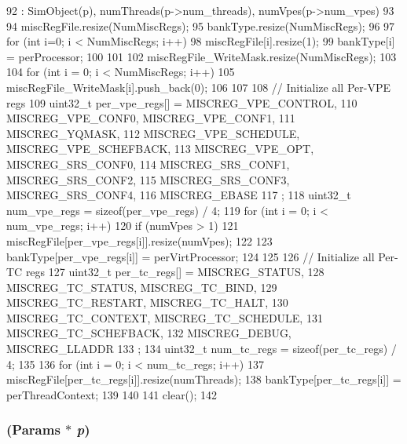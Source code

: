 \begin{DoxyCode}
92     : SimObject(p), numThreads(p->num_threads), numVpes(p->num_vpes)
93 {
94     miscRegFile.resize(NumMiscRegs);
95     bankType.resize(NumMiscRegs);
96 
97     for (int i=0; i < NumMiscRegs; i++) {
98         miscRegFile[i].resize(1);
99         bankType[i] = perProcessor;
100     }
101 
102     miscRegFile_WriteMask.resize(NumMiscRegs);
103 
104     for (int i = 0; i < NumMiscRegs; i++) {
105         miscRegFile_WriteMask[i].push_back(0);
106     }
107 
108     // Initialize all Per-VPE regs
109     uint32_t per_vpe_regs[] = { MISCREG_VPE_CONTROL,
110                                 MISCREG_VPE_CONF0, MISCREG_VPE_CONF1,
111                                 MISCREG_YQMASK,
112                                 MISCREG_VPE_SCHEDULE, MISCREG_VPE_SCHEFBACK,
113                                 MISCREG_VPE_OPT, MISCREG_SRS_CONF0,
114                                 MISCREG_SRS_CONF1, MISCREG_SRS_CONF2,
115                                 MISCREG_SRS_CONF3, MISCREG_SRS_CONF4,
116                                 MISCREG_EBASE
117                               };
118     uint32_t num_vpe_regs = sizeof(per_vpe_regs) / 4;
119     for (int i = 0; i < num_vpe_regs; i++) {
120         if (numVpes > 1) {
121             miscRegFile[per_vpe_regs[i]].resize(numVpes);
122         }
123         bankType[per_vpe_regs[i]] = perVirtProcessor;
124     }
125 
126     // Initialize all Per-TC regs
127     uint32_t per_tc_regs[] = { MISCREG_STATUS,
128                                MISCREG_TC_STATUS, MISCREG_TC_BIND,
129                                MISCREG_TC_RESTART, MISCREG_TC_HALT,
130                                MISCREG_TC_CONTEXT, MISCREG_TC_SCHEDULE,
131                                MISCREG_TC_SCHEFBACK,
132                                MISCREG_DEBUG, MISCREG_LLADDR
133                              };
134     uint32_t num_tc_regs = sizeof(per_tc_regs) /  4;
135 
136     for (int i = 0; i < num_tc_regs; i++) {
137         miscRegFile[per_tc_regs[i]].resize(numThreads);
138         bankType[per_tc_regs[i]] = perThreadContext;
139     }
140 
141     clear();
142 }
\end{DoxyCode}
\hypertarget{classMipsISA_1_1ISA_ae9132e021b3f3b20c917fc328a056bbd}{
\subsubsection[{ISA}]{ ({\bf Params} $\ast$ {\em p})}}
\label{classMipsISA_1_1ISA_ae9132e021b3f3b20c917fc328a056bbd}


